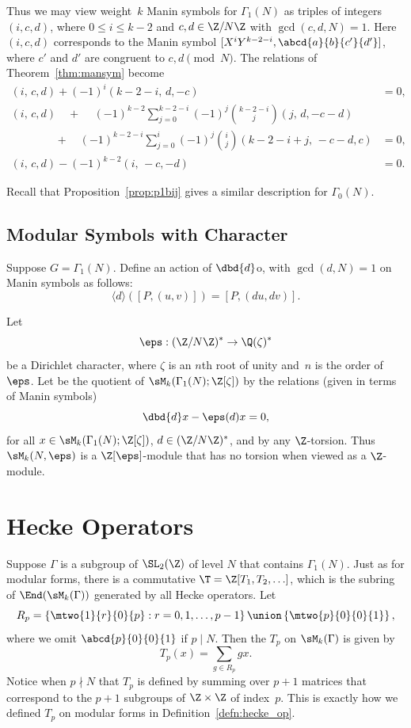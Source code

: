 Thus we may view weight~$k$ Manin symbols for $\Gamma_1(N)$ as triples
of integers $(i,c,d)$, where $0\leq i\leq k-2$ and $c, d\in\Z/N\Z$
with $\gcd(c,d,N)=1$.  Here $(i,c,d)$ corresponds to the Manin symbol
$[X^iY^{k-2-i}, \abcd{a}{b}{c'}{d'}]$, where $c'$ and $d'$ are
congruent to $c,d \pmod{N}$.  The relations of
Theorem~\ref{thm:mansym} become
\begin{align*}
(i,\,c,d) + (-1)^i (k-2-i, \,d, -c) &= 0,\\
(i,\,c,d) \quad + \quad\,        (-1)^{k-2} \sum_{j=0}^{k-2-i}  (-1)^{j} \binom{k-2-i}{j} (j,\,d,-c-d)&\\
       \qquad\qquad + \quad
(-1)^{k-2-i} \sum_{j=0}^i (-1)^j \binom{i}{j} (k-2-i+j,\,-c-d,c)
 &=0,\\
(i,\,c,d) - (-1)^{k-2}(i,\,-c,-d) &= 0.
\end{align*}

Recall that Proposition~\ref{prop:p1bij}
gives a similar description for $\Gamma_0(N)$.

\subsection{Modular Symbols with Character}
Suppose $G=\Gamma_1(N).$
Define an action of  $\dbd{d}$o,
with $\gcd(d,N)=1$ on
Manin symbols as follows:
$$
\langle d \rangle ([P,(u,v)]) = \left[P,(du, dv)\right].
$$

Let 
$$
  \eps : (\Z/N\Z)^* \to \Q(\zeta)^*
$$
be a Dirichlet character, where $\zeta$ is
an $n$th root of unity and~$n$ is the order of~$\eps$.  
Let  be the quotient of 
$\sM_k(\Gamma_1(N);\Z[\zeta])$ by the relations (given
in terms of Manin symbols)
$$
  \dbd{d}x - \eps(d)x = 0,
$$
for all $x\in \sM_k(\Gamma_1(N);\Z[\zeta])$,
$d\in (\Z/N\Z)^*$, and by any $\Z$-torsion.  
Thus $\sM_k(N,\eps)$ is a $\Z[\eps]$-module
that has no torsion when viewed as a $\Z$-module.



\section{Hecke Operators}

Suppose $\Gamma$ is a subgroup of $\SL_2(\Z)$ of level $N$
that contains $\Gamma_1(N)$. 
Just as for modular forms, there is a commutative 
$\T=\Z[T_1,T_2, \ldots]$, which is the subring of $\End(\sM_k(\Gamma))$
generated by all Hecke operators. 
Let 
$$
R_p = \left\{\mtwo{1}{r}{0}{p} : r = 0,1,\ldots, p-1 \right\} 
         \union \left\{ \mtwo{p}{0}{0}{1}\right\},
$$
where we omit $\abcd{p}{0}{0}{1}$ if $p\mid N$.  Then 
the  $T_p$ on $\sM_k(\Gamma)$
is given by
$$
  T_p(x) = \sum_{g \in R_p} gx.
$$
Notice when $p\nmid N$ that $T_p$ is defined by summing over 
$p+1$ matrices that correspond to the $p+1$ subgroups of $\Z\times \Z$
of index~$p$.  This is exactly how we defined $T_p$ on modular forms
in Definition~\ref{defn:hecke_op}.



